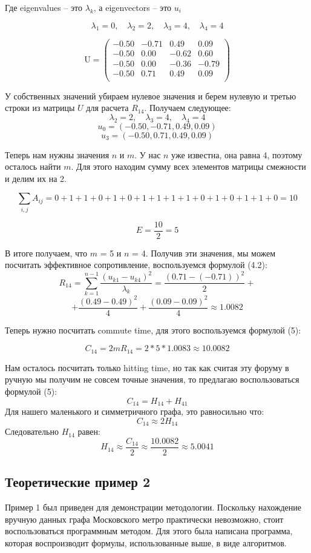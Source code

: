 \documentclass[utf8x]{G7-32} %
\begin{document}
Где eigenvalues – это \(\lambda_k\), а eigenvectors –  это  \(u_{i}\)

$$\lambda_1 = 0, \quad \lambda_2 = 2, \quad \lambda_3 = 4, \quad \lambda_4 = 4$$

\[
\text{U} =  \begin{pmatrix} 
-0.50 & -0.71 & 0.49 & 0.09 \\
-0.50 & 0.00 & -0.62 & 0.60 \\
-0.50 & 0.00 & -0.36 & -0.79 \\
-0.50 & 0.71 & 0.49 & 0.09 \\
\end{pmatrix} 
\]



У собственных значений убираем нулевое значения и берем нулевую и третью строки из матрицы \(U\) для расчета \(R_{14}\). Получаем следующее:
$$ \lambda_2 = 2, \quad \lambda_3 = 4, \quad \lambda_4 = 4 $$
$$ u_0  = (-0.50, -0.71, 0.49, 0.09)$$
$$ u_3  = (-0.50, 0.71, 0.49, 0.09)$$

Теперь нам нужны значения \(n\) и \(m\). У нас \(n\) уже известна, она равна 4, поэтому осталось найти \(m\). Для этого находим сумму всех элементов матрицы смежности и делим их на 2.

$$ \sum_{i,j} A_{ij} = 0 + 1 + 1 + 0 + 1 + 0 + 1 + 1 + 1 + 1 + 0 + 1 + 0 + 1 + 1 + 0 = 10$$

$$ E = \frac{10}{2} = 5$$

В итоге получаем, что \(m\) = 5 и \(n\) = 4. Получив эти значения, мы можем посчитать эффективное сопротивление, воспользуемся формулой (4.2):
$$ R_{14} = \sum_{k=1}^{n-1} \frac{(u_{k1} - u_{k4})^2}{\lambda_k} = \frac{(0.71 - (-0.71))^2}{2} + $$
$$ + \frac{(0.49 - 0.49)^2}{4} + \frac{(0.09 - 0.09)^2}{4} \approx 1.0082$$

Теперь нужно посчитать commute time, для этого воспользуемся формулой (5):

$$ C_{14} = 2mR_{14} = 2 * 5 * 1.0083 \approx 10.0082$$

Нам осталось посчитать только hitting time, но так как считая эту форуму в ручную мы получим не совсем точные значения, то предлагаю воспользоваться формулой (5):
$$ C_{14} = H_{14} + H_{41} $$
Для нашего маленького и симметричного графа, это равносильно что:
$$ C_{14} \approx 2H_{14} $$
Следовательно \(H_{14}\) равен:
$$ H_{14}  \approx \frac{C_{14} }{2} \approx \frac{10.0082}{2} \approx 5.0041$$ 

\subsection{Теоретические пример 2}
Пример 1 был приведен для демонстрации методологии. Поскольку нахождение вручную данных графа Московского метро практически невозможно, стоит воспользоваться программным методом. Для этого была написана программа, которая воспроизводит формулы, использованные выше, в виде алгоритмов.
\end{document}
